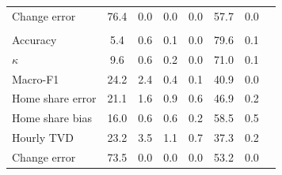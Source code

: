 \documentclass[a4paper]{article}
\begin{document}
\begin{table}[ht]
\begin{tabular}{l S[table-format=3.1] S[table-format=3.1] S[table-format=3.1] S[table-format=3.1] S[table-format=3.1] S[table-format=3.1] S[table-format=3.1]}
\quad Change error & 76.4 & 0.0 & 0.0 & 0.0 & 57.7 & 0.0 &  \\
\addlinespace
{} \\
\quad Accuracy & 5.4 & 0.6 & 0.1 & 0.0 & 79.6 & 0.1 &  \\
\quad $\kappa$ & 9.6 & 0.6 & 0.2 & 0.0 & 71.0 & 0.1 &  \\
\quad Macro-F1 & 24.2 & 2.4 & 0.4 & 0.1 & 40.9 & 0.0 &  \\
\quad Home share error & 21.1 & 1.6 & 0.9 & 0.6 & 46.9 & 0.2 &  \\
\quad Home share bias & 16.0 & 0.6 & 0.6 & 0.2 & 58.5 & 0.5 &  \\
\quad Hourly TVD & 23.2 & 3.5 & 1.1 & 0.7 & 37.3 & 0.2 &  \\
\quad Change error & 73.5 & 0.0 & 0.0 & 0.0 & 53.2 & 0.0 &  \\
\bottomrule
\end{tabular}
\end{table}
\end{document}
